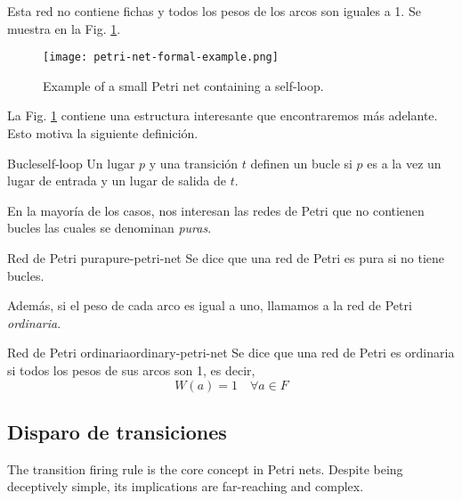 Esta red no contiene fichas y todos los pesos de los arcos son iguales a 1.
Se muestra en la Fig. \ref{fig:petri-net-formal-example}.

\begin{figure}[!htb]
      \centering
      \texttt{[image: petri-net-formal-example.png]}
      \caption{Example of a small Petri net containing a self-loop.}
      \label{fig:petri-net-formal-example}
\end{figure}

La Fig. \ref{fig:petri-net-formal-example}
contiene una estructura interesante que encontraremos más adelante.
Esto motiva la siguiente definición.

\begin{definition}{Bucle}{self-loop}
      Un lugar $p$ y una transición $t$ definen un bucle si
      $p$ es a la vez un lugar de entrada y un lugar de salida de $t$.
\end{definition}

En la mayoría de los casos, nos interesan las redes de Petri que no contienen bucles
las cuales se denominan \emph{puras}.

\begin{definition}{Red de Petri pura}{pure-petri-net}
      Se dice que una red de Petri es pura si no tiene bucles.
\end{definition}

Además, si el peso de cada arco es igual a uno, llamamos a la red de Petri \emph{ordinaria}.

\begin{definition}{Red de Petri ordinaria}{ordinary-petri-net}
      Se dice que una red de Petri es ordinaria si todos los pesos de sus arcos son 1, es decir,
      \begin{equation*}
            W(a) = 1 \quad \forall a \in F
      \end{equation*}
\end{definition}

\subsection{Disparo de transiciones}
\label{sec:transition-firing}

The transition firing rule is the core concept in Petri nets.
Despite being deceptively simple, its implications are far-reaching and complex.

